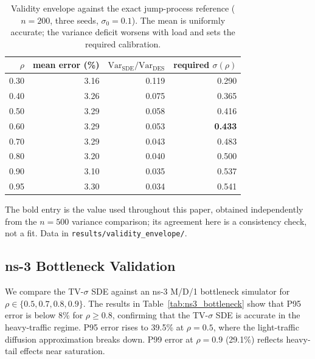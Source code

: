 \documentclass{ieeeaccess}
\begin{document}
\begin{table}[!t]
\caption{Validity envelope against the exact jump-process reference ($n{=}200$, three seeds,
$\sigma_0{=}0.1$). The mean is uniformly accurate; the variance deficit worsens with load and
sets the required calibration.}
\label{tab:validity_envelope}
\centering
\begin{tabular}{@{}r r r r@{}}
\toprule
$\rho$ & mean error (\%) & $\mathrm{Var}_{\mathrm{SDE}}/\mathrm{Var}_{\mathrm{DES}}$ & required $\sigma(\rho)$ \\
\midrule
0.30 & 3.16 & 0.119 & 0.290 \\
0.40 & 3.26 & 0.075 & 0.365 \\
0.50 & 3.29 & 0.058 & 0.416 \\
0.60 & 3.29 & 0.053 & \textbf{0.433} \\
0.70 & 3.29 & 0.043 & 0.483 \\
0.80 & 3.20 & 0.040 & 0.500 \\
0.90 & 3.10 & 0.035 & 0.537 \\
0.95 & 3.30 & 0.034 & 0.541 \\
\bottomrule
\end{tabular}
\vspace{2pt}
\parbox{\columnwidth}{\footnotesize The bold entry is the value used throughout this paper, obtained independently
from the $n{=}500$ variance comparison; its agreement here is a consistency check, not a fit.
Data in \texttt{results/validity\_envelope/}.}
\end{table}

\subsection{ns-3 Bottleneck Validation}
\label{subsec:ns3_validation}

We compare the TV-$\sigma$ SDE against an ns-3 M/D/1 bottleneck simulator for
$\rho\in\{0.5,0.7,0.8,0.9\}$. The results in Table~\ref{tab:ns3_bottleneck} show that P95
error is below 8\% for $\rho\geq0.8$, confirming that the TV-$\sigma$ SDE is accurate in the
heavy-traffic regime. P95 error rises to 39.5\% at $\rho=0.5$, where the light-traffic
diffusion approximation breaks down. P99 error at $\rho=0.9$ (29.1\%) reflects heavy-tail
effects near saturation.
\end{document}
